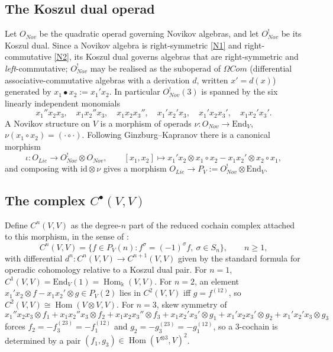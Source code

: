 \documentclass[11pt,reqno]{amsart}
\theoremstyle{plain}
\theoremstyle{definition}
\DeclareMathOperator{\Hom}{Hom}
\newcommand{\kk}{\Bbbk}
\begin{document}
\subsection{The Koszul dual operad}
Let $O_{Nov}$ be the quadratic operad governing Novikov algebras, and let $O_{Nov}^!$ be its
Koszul dual. Since a Novikov algebra is right-symmetric \eqref{N1} and right-commutative
\eqref{N2}, its Koszul dual governs algebras that are right-symmetric and
\emph{left}-commutative; $O_{Nov}^!$ may be realised as the suboperad of $\Omega Com$
(differential associative-commutative algebras with a derivation $d$, written $x'=d(x)$)
generated by $x_1\bullet x_2:=x_1'x_2$. In particular $O_{Nov}^!(3)$ is spanned by the six
linearly independent monomials
\[
x_1''x_2x_3,\quad x_1x_2''x_3,\quad x_1x_2x_3'',\quad
x_1'x_2'x_3,\quad x_1'x_2x_3',\quad x_1x_2'x_3' .
\]
A Novikov structure on $V$ is a morphism of operads $\nu:O_{Nov}\to\mathrm{End}_V$,
$\nu(x_1\circ x_2)=(\cdot\circ\cdot)$. Following Ginzburg--Kapranov \cite{GinzburgKapranov}
there is a canonical morphism
\[
\iota:O_{Lie}\longrightarrow O_{Nov}^!\otimes O_{Nov},\qquad
[x_1,x_2]\longmapsto x_1'x_2\otimes x_1\circ x_2-x_1x_2'\otimes x_2\circ x_1,
\]
and composing with $\mathrm{id}\otimes\nu$ gives a morphism
$O_{Lie}\to P_V:=O_{Nov}^!\otimes\mathrm{End}_V$.

\subsection{The complex $C^\bullet(V,V)$}
Define $C^n(V,V)$ as the degree-$n$ part of the reduced cochain complex attached to this
morphism, in the sense of \cite{Balavoine1997,kol}:
\[
C^n(V,V)=\{f\in P_V(n):f^\sigma=(-1)^\sigma f,\ \sigma\in S_n\},\qquad n\ge1,
\]
with differential $d^n:C^n(V,V)\to C^{n+1}(V,V)$ given by the standard formula for
operadic cohomology relative to a Koszul dual pair. For $n=1$, $C^1(V,V)=\mathrm{End}_V(1)=
\Hom_\kk(V,V)$. For $n=2$, an element $x_1'x_2\otimes f-x_1x_2'\otimes g\in P_V(2)$ lies in
$C^2(V,V)$ iff $g=f^{(12)}$, so $C^2(V,V)\cong\Hom(V\otimes V,V)$. For $n=3$, skew symmetry
of
\[
x_1''x_2x_3\otimes f_1+x_1x_2''x_3\otimes f_2+x_1x_2x_3''\otimes f_3
+x_1x_2'x_3'\otimes g_1+x_1'x_2x_3'\otimes g_2+x_1'x_2'x_3\otimes g_3
\]
forces $f_2=-f_3^{(23)}=-f_1^{(12)}$ and $g_2=-g_3^{(23)}=-g_1^{(12)}$, so a $3$-cochain is
determined by a pair $(f_1,g_3)\in\Hom(V^{\otimes3},V)^2$.
\end{document}
